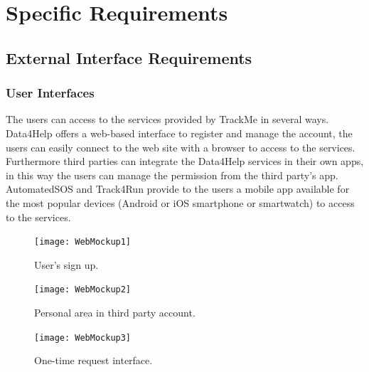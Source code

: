 \documentclass[a4paper]{article}
\begin{document}
\section{Specific Requirements}

\subsection{External Interface Requirements}

\subsubsection{User Interfaces}

The users can access to the services provided by TrackMe in several ways.
Data4Help offers a web-based interface to register and manage the account, the users can easily connect to the web site with a browser to access to the services.
\newline Furthermore third parties can integrate the Data4Help services in their own apps, in this way the users can manage the permission from the third party's app.
AutomatedSOS and Track4Run provide to the users a mobile app available for the most popular devices (Android or iOS smartphone or smartwatch) to access to the services.

\vspace{1cm}

\begin{figure}[H]
    \centering
    \texttt{[image: WebMockup1]}
    \caption{User's sign up.}
    \label{fig:my_label}
\end{figure}

\begin{figure}[H]
    \centering
    \texttt{[image: WebMockup2]}
    \caption{Personal area in third party account.}
    \label{fig:my_label}
\end{figure}

\vspace{0.5cm}

\begin{figure}[H]
    \centering
    \texttt{[image: WebMockup3]}
    \caption{One-time request interface.}
    \label{fig:my_label}
\end{figure}
\end{document}
